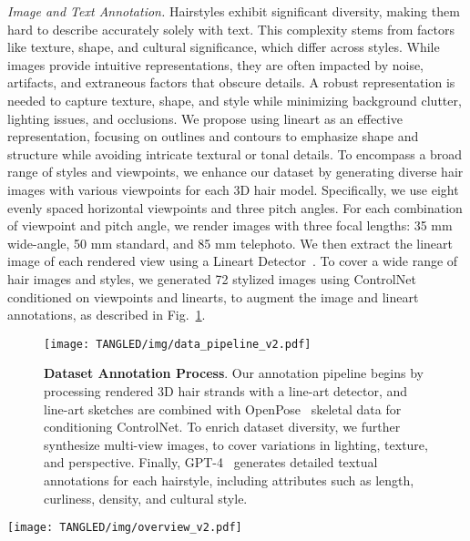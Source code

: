 \vspace{8pt}
\noindent \textit{Image and Text Annotation.}
%
Hairstyles exhibit significant diversity, making them hard to describe accurately solely with text. This complexity stems from factors like texture, shape, and cultural significance, which differ across styles. While images provide intuitive representations, they are often impacted by noise, artifacts, and extraneous factors that obscure details. A robust representation is needed to capture texture, shape, and style while minimizing background clutter, lighting issues, and occlusions. We propose using lineart as an effective representation, focusing on outlines and contours to emphasize shape and structure while avoiding intricate textural or tonal details.
%
To encompass a broad range of styles and viewpoints, we enhance our dataset by generating diverse hair images with various viewpoints for each 3D hair model.
%
Specifically, we use eight evenly spaced horizontal viewpoints and three pitch angles. For each combination of viewpoint and pitch angle, we render images with three focal lengths: 35 mm wide-angle, 50 mm standard, and 85 mm telephoto. We then extract the lineart image of each rendered view using a Lineart Detector~\cite{zhang2023adding}. To cover a wide range of hair images and styles, we generated 72 stylized images using ControlNet~\cite{zhang2023adding} conditioned on viewpoints and linearts, to augment the image and lineart annotations, as described in Fig.~\ref{fig:DataAc}.



\begin{figure}[tbp] 
  \texttt{[image: TANGLED/img/data\_pipeline\_v2.pdf]}
  \caption{\textbf{Dataset Annotation Process}. 
  Our annotation pipeline begins by processing rendered 3D hair strands with a line-art detector, and line-art sketches are combined with OpenPose~\cite{cao2017realtime} skeletal data for conditioning ControlNet. To enrich dataset diversity, we further synthesize multi-view images, to cover variations in lighting, texture, and perspective. Finally, GPT-4~\cite{chatgpt2025} generates detailed textual annotations for each hairstyle, including attributes such as length, curliness, density, and cultural style.
  }
  \label{fig:DataAc}
\end{figure}



\begin{figure*}[tbp]
  \centering
  \texttt{[image: TANGLED/img/overview\_v2.pdf]}
   \label{fig_overview}
\end{figure*}


